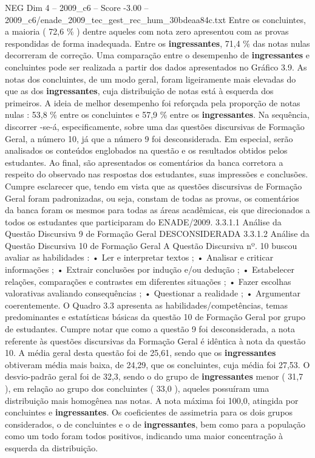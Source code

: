 \begin{textsample}{NEG Dim 4 – 2009\_c6 – Score -3.00 – 2009\_c6/enade\_2009\_tec\_gest\_rec\_hum\_30bdeaa84c.txt}
Entre os concluintes, a maioria ( 72,6 \% ) dentre aqueles com nota zero apresentou com as provas respondidas de forma inadequada.
Entre os \textbf{ingressantes}, 71,4 \% das notas nulas decorreram de correção.
Uma comparação entre o desempenho de \textbf{ingressantes} e concluintes pode ser realizada a partir dos dados apresentados no Gráfico 3.9.
As notas dos concluintes, de um modo geral, foram ligeiramente mais elevadas do que as dos \textbf{ingressantes}, cuja distribuição de notas está à esquerda dos primeiros.
A ideia de melhor desempenho foi reforçada pela proporção de notas nulas : 53,8 \% entre os concluintes e 57,9 \% entre os \textbf{ingressantes}.
Na sequência, discorrer -se-á, especificamente, sobre uma das questões discursivas de Formação Geral, a número 10, já que a número 9 foi desconsiderada.
Em especial, serão analisados os conteúdos englobados na questão e os resultados obtidos pelos estudantes.
Ao final, são apresentados os comentários da banca corretora a respeito do observado nas respostas dos estudantes, suas impressões e conclusões.
Cumpre esclarecer que, tendo em vista que as questões discursivas de Formação Geral foram padronizadas, ou seja, constam de todas as provas, os comentários da banca foram os mesmos para todas as áreas acadêmicas, eis que direcionados a todos os estudantes que participaram do ENADE/2009. 3.3.1.1 Análise da Questão Discursiva 9 de Formação Geral DESCONSIDERADA 3.3.1.2 Análise da Questão Discursiva 10 de Formação Geral A Questão Discursiva nº. 10 buscou avaliar as habilidades : • Ler e interpretar textos ; • Analisar e criticar informações ; • Extrair conclusões por indução e/ou dedução ; • Estabelecer relações, comparações e contrastes em diferentes situações ; • Fazer escolhas valorativas avaliando consequências ; • Questionar a realidade ; • Argumentar coerentemente.
O Quadro 3.3 apresenta as habilidades/competências, temas predominantes e estatísticas básicas da questão 10 de Formação Geral por grupo de estudantes.
Cumpre notar que como a questão 9 foi desconsiderada, a nota referente às questões discursivas da Formação Geral é idêntica à nota da questão 10.
A média geral desta questão foi de 25,61, sendo que os \textbf{ingressantes} obtiveram média mais baixa, de 24,29, que os concluintes, cuja média foi 27,53.
O desvio-padrão geral foi de 32,3, sendo o do grupo de \textbf{ingressantes} menor ( 31,7 ), em relação ao grupo dos concluintes ( 33,0 ), aqueles possuíram uma distribuição mais homogênea nas notas.
A nota máxima foi 100,0, atingida por concluintes e \textbf{ingressantes}.
Os coeficientes de assimetria para os dois grupos considerados, o de concluintes e o de \textbf{ingressantes}, bem como para a população como um todo foram todos positivos, indicando uma maior concentração à esquerda da distribuição.

\end{textsample}
